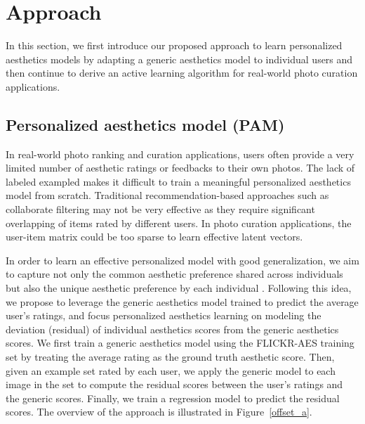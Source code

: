 \section{Approach}
In this section, we first introduce our proposed approach to learn personalized aesthetics models by adapting a generic aesthetics model to individual users and then continue to derive an active learning algorithm for real-world photo curation applications. 
\subsection{Personalized aesthetics model (PAM)}\label{PAM}

In real-world photo ranking and curation applications, users often provide a very limited number of aesthetic ratings or feedbacks to their own photos. The lack of labeled exampled makes it difficult to train a meaningful personalized aesthetics model from scratch. Traditional recommendation-based approaches such as collaborate filtering may not be very effective as they require significant overlapping of items rated by different users. In photo curation applications, the user-item matrix could be too sparse to learn effective latent vectors\cite{o2014collaborative}. 

In order to learn an effective personalized model with good generalization, we aim to capture not only the common aesthetic preference shared across individuals\cite{bronstad2007beauty} but also the unique aesthetic preference by each individual \cite{yeh2014personalized, vessel2014personalized} .
Following this idea, we propose to leverage the generic aesthetics model trained to predict the average user's ratings, and focus personalized aesthetics learning on modeling the deviation (residual) of individual aesthetics scores from the generic aesthetics scores. We first train a generic aesthetics model using the FLICKR-AES training set by treating the average rating as the ground truth aesthetic score. Then, given an example set rated by each user, we apply the generic model to each image in the set to compute the residual scores between the user's ratings and the generic scores. Finally, we train a regression model\cite{chang2002training} to predict the residual scores. The overview of the approach is illustrated in Figure~\ref{offset_a}.


